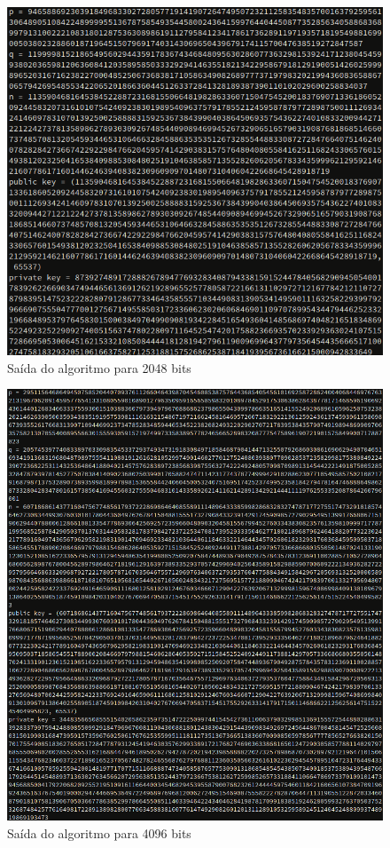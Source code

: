 \documentclass[12pt]{article}
\begin{document}
\begin{figure}[ht]
    \centering
    \includegraphics[width=\textwidth]{rsa_2048.png}
    \caption{Saída do algoritmo para 2048 bits}
    \label{fig:rsa_2048}
\end{figure}

\begin{figure}[ht]
    \centering
    \includegraphics[width=\textwidth]{rsa_4096.png}
    \caption{Saída do algoritmo para 4096 bits}
    \label{fig:rsa_4096}
\end{figure}
\end{document}
